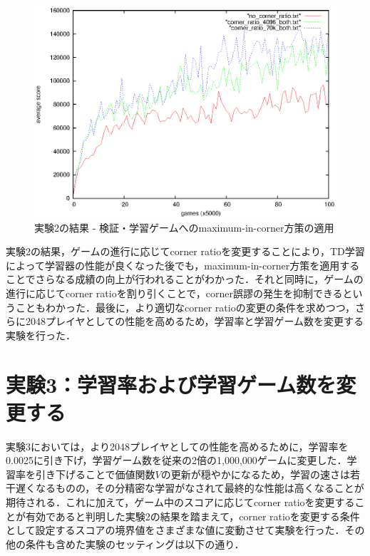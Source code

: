 \documentclass{suribt}
\begin{document}
\begin{figure}[tb]
	\begin{center}
	\includegraphics[width=13cm]{figure_009.eps}
	\caption{実験2の結果 - 検証・学習ゲームへのmaximum-in-corner方策の適用}
	\label{figure_009}
	\end{center}
\end{figure}

実験2の結果，ゲームの進行に応じてcorner ratioを変更することにより，TD学習によって学習器の性能が良くなった後でも，maximum-in-corner方策を適用することでさらなる成績の向上が行われることがわかった．それと同時に，ゲームの進行に応じてcorner ratioを割り引くことで，corner誤謬の発生を抑制できるということもわかった．最後に，より適切なcorner ratioの変更の条件を求めつつ，さらに2048プレイヤとしての性能を高めるため，学習率と学習ゲーム数を変更する実験を行った．

\section{実験3：学習率および学習ゲーム数を変更する}
実験3においては，より2048プレイヤとしての性能を高めるために，学習率を0.0025に引き下げ，学習ゲーム数を従来の2倍の1,000,000ゲームに変更した．学習率を引き下げることで価値関数$V$の更新が穏やかになるため，学習の速さは若干遅くなるものの，その分精密な学習がなされて最終的な性能は高くなることが期待される．これに加えて，ゲーム中のスコアに応じてcorner ratioを変更することが有効であると判明した実験2の結果を踏まえて，corner ratioを変更する条件として設定するスコアの境界値をさまざまな値に変動させて実験を行った．その他の条件も含めた実験のセッティングは以下の通り．
\end{document}
